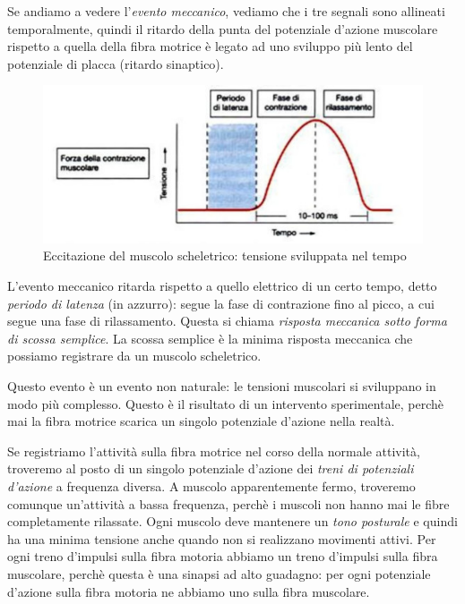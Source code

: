 \documentclass[a4paper,12pt]{article}
\begin{document}
Se andiamo a vedere l'\emph{evento meccanico}, vediamo che i tre segnali sono allineati temporalmente, quindi il ritardo della punta del potenziale d'azione muscolare rispetto a quella della fibra motrice è legato ad uno sviluppo più lento del potenziale di placca (ritardo sinaptico).
\begin{figure}[H]
\centering
\includegraphics[scale=0.4]{immagine/eccitazione1.jpg}
\caption{Eccitazione del muscolo scheletrico: tensione sviluppata nel tempo}
\end{figure}

L'evento meccanico ritarda rispetto a quello elettrico di un certo tempo, detto \emph{periodo di latenza} (in azzurro): segue la fase di contrazione fino al picco, a cui segue una fase di rilassamento. Questa si chiama \emph{risposta meccanica sotto forma di scossa semplice}. La scossa semplice è la minima risposta meccanica che possiamo registrare da un muscolo scheletrico. 

Questo evento è un evento non naturale: le tensioni muscolari si sviluppano in modo più complesso. Questo è il risultato di un intervento sperimentale, perchè mai la fibra motrice scarica un singolo potenziale d'azione nella realtà.

Se registriamo l'attività sulla fibra motrice nel corso della normale attività, troveremo al posto di un singolo potenziale d'azione dei \emph{treni di potenziali d'azione} a frequenza diversa. A muscolo apparentemente fermo, troveremo comunque un'attività a bassa frequenza, perchè i muscoli non hanno mai le fibre completamente rilassate. Ogni muscolo deve mantenere un \emph{tono posturale} e quindi ha una minima tensione anche quando non si realizzano movimenti attivi. Per ogni treno d'impulsi sulla fibra motoria abbiamo un treno d'impulsi sulla fibra muscolare, perchè questa è una sinapsi ad alto guadagno: per ogni potenziale d'azione sulla fibra motoria ne abbiamo uno sulla fibra muscolare.
\end{document}
